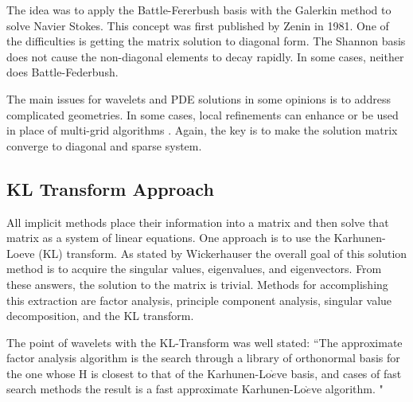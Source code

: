 The idea was to apply the Battle-Fererbush basis with the Galerkin method to solve Navier Stokes.  This concept was first published by Zenin in 1981.  One of the difficulties is getting the matrix solution to diagonal form.  The Shannon basis does not cause the non-diagonal elements to decay rapidly.  In some cases, neither does Battle-Federbush.  

The main issues for wavelets and PDE solutions in some opinions is to address complicated geometries.  In some cases, %
local refinements can enhance or be used in place of multi-grid algorithms%
.   Again, the key is to make the solution matrix converge to diagonal and sparse system.  


\subsection {KL Transform Approach}
All implicit methods place their information into a matrix and then solve that matrix as a system of linear equations.  One approach is to use the Karhunen-Loeve (KL) transform.   As stated by Wickerhauser \cite{victor} the overall goal of this solution method is to acquire the singular values, eigenvalues, and eigenvectors.  From these answers, the solution to the matrix is trivial.  Methods for accomplishing this extraction are factor analysis, principle component analysis, singular value decomposition, and the KL transform.  



The point of wavelets with the KL-Transform was well stated: ``The approximate factor analysis algorithm is the search through a library of orthonormal basis for the one whose H is closest to that of the Karhunen-Lo$\grave{e}$ve basis, and cases of fast search methods the result is a fast approximate Karhunen-Lo$\grave{e}$ve algorithm.  "\cite{victor}  

